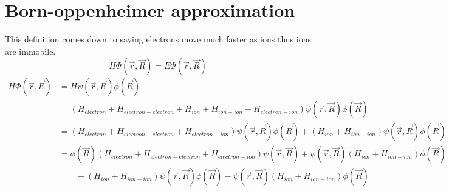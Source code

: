 \section{Born-oppenheimer approximation}
This definition comes down to saying electrons move much faster as ions thus ions are immobile.
\begin{equation}
	H\Phi(\vec{r}, \vec{R}) = E\Phi(\vec{r}, \vec{R})
\end{equation}
\begin{align}
	H\Phi(\vec{r}, \vec{R}) & = H\psi(\vec{r}, \vec{R})\phi(\vec{R}) \\
	& = (H_{electron} + H_{electron - electron} + H_{ion} + H_{ion - ion} + H_{electron - ion})\psi(\vec{r}, \vec{R})\phi(\vec{R}) \\
	& = (H_{electron} + H_{electron - electron} + H_{electron - ion})\psi(\vec{r}, \vec{R})\phi(\vec{R}) + (H_{ion} + H_{ion - ion})\psi(\vec{r}, \vec{R})\phi(\vec{R}) \\
	& = \phi(\vec{R})(H_{electron} + H_{electron - electron} + H_{electron - ion})\psi(\vec{r}, \vec{R}) + \psi(\vec{r}, \vec{R})(H_{ion} + H_{ion - ion})\phi(\vec{R}) \nonumber \\
	& \qquad + (H_{ion} + H_{ion - ion})\psi(\vec{r}, \vec{R})\phi(\vec{R}) - \psi(\vec{r}, \vec{R})(H_{ion} + H_{ion - ion})\phi(\vec{R})
\end{align}

